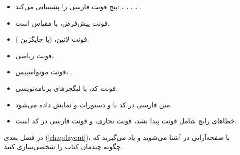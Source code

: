 \begin{itemize}
    \item {} پنج فونت فارسی
    را پشتیبانی می‌کند: ،
    ، ، ،
    .

    \item فونت پیش‌فرض،  با
    مقیاس  است.

    \item فونت لاتین، 
    (با جایگزین ).

    \item فونت ریاضی، .

    \item فونت مونواسپیس، .

    \item فونت کد،  با
    لیگچرهای برنامه‌نویسی.

    \item متن فارسی در کد با 
    و دستورات  و  نمایش داده
    می‌شود.

    \item خطاهای رایج شامل فونت پیدا نشد،
    فونت تجاری، و فونت فارسی در کد است.
\end{itemize}

در فصل بعدی (\cref{chap:layout})، با
صفحه‌آرایی در  آشنا می‌شوید
و یاد می‌گیرید که چگونه چیدمان کتاب را
شخصی‌سازی کنید.